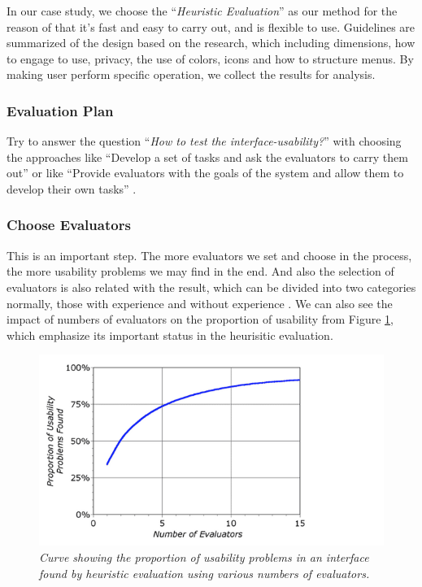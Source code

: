\documentclass[twocolumn]{article}
\begin{document}
In our case study, we choose the “\emph{Heuristic Evaluation}” as our method for the reason of that it’s fast and easy to carry out, and is flexible to use. Guidelines are summarized of the design based on the research, which including dimensions, how to engage to use, privacy, the use of colors, icons and how to structure menus. By making user perform specific operation, we collect the results for analysis.

\subsubsection{Evaluation Plan}
Try to answer the question “\emph{How to test the interface-usability?}”  with choosing the approaches like “Develop a set of tasks and ask the evaluators to carry them out” or like “Provide evaluators with the goals of the system and allow them to develop their own tasks” \citep{Danino2001}.

\subsubsection{Choose Evaluators}
This is an important step. The more evaluators we set and choose in the process, the more usability problems we may find in the end. And also the selection of evaluators is also related with the result, which can be divided into two categories normally, those with experience and without experience \citep{Danino2001}. We can also see the impact of numbers of evaluators on the proportion of usability from Figure \ref{fig:usability-problems-found}, which emphasize its important status in the heurisitic evaluation.

\begin{figure}
  \centering
  \includegraphics[width=\columnwidth, clip=true, trim=0 0 140 0]{fig/usability-problems-found.png}
  \caption{\emph{Curve showing the proportion of usability problems in an interface found by heuristic evaluation using various numbers of evaluators. \citep{Nielsen1995HowToHeuristicEvaluation}}}
  \label{fig:usability-problems-found}
\end{figure}
\end{document}
